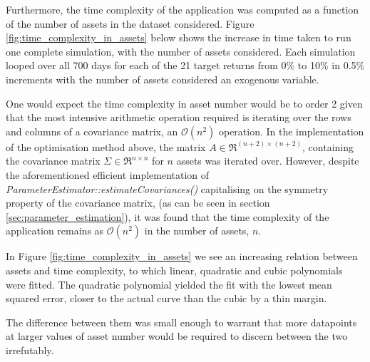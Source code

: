 \documentclass{article}
\begin{document}
Furthermore, the time complexity of the application was computed as a function of the number of assets in the dataset considered. Figure \ref{fig:time_complexity_in_assets} below shows the increase in time taken to run one complete simulation, with the number of assets considered. Each simulation looped over all 700 days for each of the 21 target returns from 0\% to 10\% in 0.5\% increments with the number of assets considered an exogenous variable.

One would expect the time complexity in asset number would be to order 2 given that the most intensive arithmetic operation required is iterating over the rows and columns of a covariance matrix, an $\mathcal{O}(n^2)$ operation. In the implementation of the optimisation method above, the matrix $A \in \Re^{(n+2) \times (n+2)}$, containing the covariance matrix $\Sigma \in \Re^{n \times n} $ for $n$ assets was iterated over. However, despite the aforementioned efficient implementation of \textit{ParameterEstimator::estimateCovariances()} capitalising on the symmetry property of the covariance matrix, (as can be seen in section \ref{sec:parameter_estimation}), it was found that the time complexity of the application remains as $\mathcal{O}(n^2)$ in the number of assets, $n$.


In Figure \ref{fig:time_complexity_in_assets} we see an increasing relation between assets and time complexity, to which linear, quadratic and cubic polynomials were fitted. The quadratic polynomial yielded the fit with the lowest mean squared error, closer to the actual curve than the cubic by a thin margin.

The difference between them was small enough to warrant that more datapoints at larger values of asset number would be required to discern between the two irrefutably.
\end{document}
